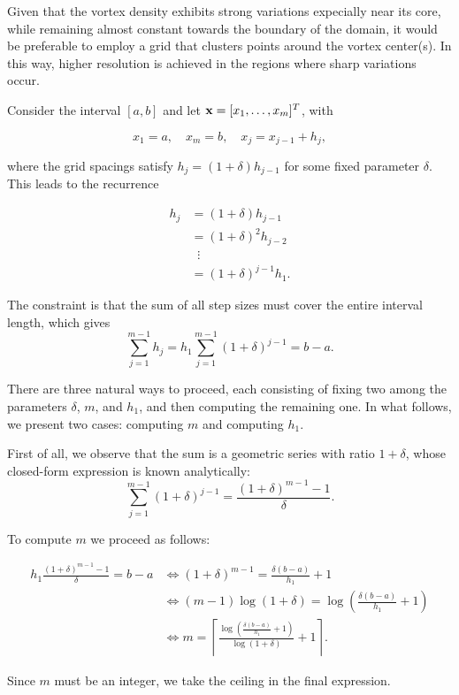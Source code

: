 Given that the vortex density exhibits strong variations expecially near its core, while remaining almost constant towards the boundary of the domain, it would be preferable to employ a grid that clusters points around the vortex center(s). 
In this way, higher resolution is achieved in the regions where sharp variations occur.

Consider the interval $[a,b]$ and let $\mathbf{x} = [x_1, \dots, x_m]^T$, with 

\[
    x_1 = a, \quad x_m = b, \quad x_j = x_{j-1} + h_j,
\]

where the grid spacings satisfy $h_j = (1 + \delta) h_{j-1}$ for some fixed parameter $\delta$.  
This leads to the recurrence

\begin{align*}
    h_j &= (1 + \delta) h_{j-1} \\
        &= (1 + \delta)^2 h_{j-2} \\
        &\;\;\vdots \\
        &= (1 + \delta)^{j-1} h_1.
\end{align*}

The constraint is that the sum of all step sizes must cover the entire interval length, which gives
\[
    \sum_{j=1}^{m-1} h_j
    = h_1 \sum_{j=1}^{m-1} (1+\delta)^{j-1} 
    = b-a.
\]

There are three natural ways to proceed, each consisting of fixing two among the parameters $\delta$, $m$, and $h_1$, and then computing the remaining one.  
In what follows, we present two cases: computing $m$ and computing $h_1$.

First of all, we observe that the sum is a geometric series with ratio $1+\delta$, whose closed-form expression is known analytically:  
\[
    \sum_{j=1}^{m-1} (1+\delta)^{j-1} = \frac{(1+\delta)^{m-1} - 1}{\delta}.
\]

To compute $m$ we proceed as follows:

\begin{align*}
    h_1 \frac{(1+\delta)^{m-1} - 1}{\delta} = b-a 
    &\iff (1+\delta)^{m-1} = \frac{\delta(b-a)}{h_1} + 1 \\
    &\iff (m-1)\log(1+\delta) = \log\!\left(\frac{\delta(b-a)}{h_1} + 1\right) \\
    &\iff m = \left\lceil \frac{\log\!\left(\tfrac{\delta(b-a)}{h_1} + 1\right)}{\log(1+\delta)} + 1 \right\rceil.
\end{align*}

Since $m$ must be an integer, we take the ceiling in the final expression.

